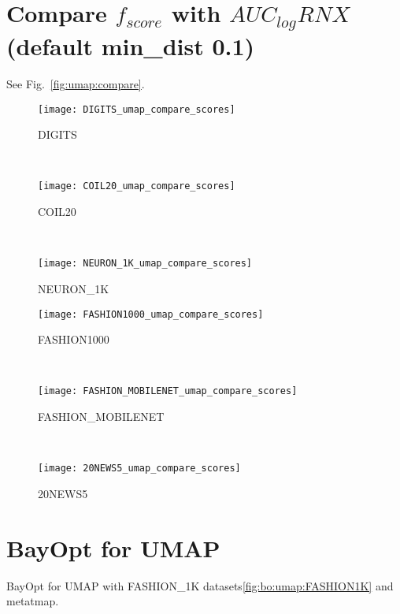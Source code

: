 \section{Compare $f_{score}$ with $AUC_{log}RNX$ (default min\_dist 0.1)}
See Fig.~\ref{fig:umap:compare}.

\begin{figure*}%
    \centering
    \begin{subfigure}[b]{0.32\textwidth}
        \centering
        \texttt{[image: DIGITS\_umap\_compare\_scores]}
        \caption{DIGITS}
    \end{subfigure}
    ~
    \begin{subfigure}[b]{0.32\textwidth}
        \texttt{[image: COIL20\_umap\_compare\_scores]}
        \caption{COIL20}
    \end{subfigure}
    ~
    \begin{subfigure}[b]{0.32\textwidth}
        \texttt{[image: NEURON\_1K\_umap\_compare\_scores]}
        \caption{NEURON\_1K}
    \end{subfigure}
    \vfill
    \begin{subfigure}[b]{0.32\textwidth}
        \centering
        \texttt{[image: FASHION1000\_umap\_compare\_scores]}
        \caption{FASHION1000}
    \end{subfigure}
    ~
    \begin{subfigure}[b]{0.32\textwidth}
        \texttt{[image: FASHION\_MOBILENET\_umap\_compare\_scores]}
        \caption{FASHION\_MOBILENET}
    \end{subfigure}
    ~
    \begin{subfigure}[b]{0.32\textwidth}
        \texttt{[image: 20NEWS5\_umap\_compare\_scores]}
        \caption{20NEWS5}
    \end{subfigure}
    \caption{Comparing constraint score and $AUC_{log}RNX$ score for the embeddings of UMAP with fixed \texttt{min\_dist=0.1}.}
    \label{fig:umap:compare}
\end{figure*}


\section{BayOpt for UMAP}
BayOpt for UMAP with {FASHION\_1K} datasets\ref{fig:bo:umap:FASHION1K} and metatmap.

